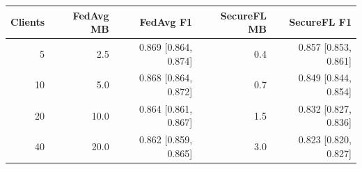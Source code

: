 \begin{tabular}{rrrrr}
\toprule
Clients & FedAvg MB & FedAvg F1 & SecureFL MB & SecureFL F1 \\
\midrule
5 & 2.5 & 0.869 [0.864, 0.874] & 0.4 & 0.857 [0.853, 0.861] \\
10 & 5.0 & 0.868 [0.864, 0.872] & 0.7 & 0.849 [0.844, 0.854] \\
20 & 10.0 & 0.864 [0.861, 0.867] & 1.5 & 0.832 [0.827, 0.836] \\
40 & 20.0 & 0.862 [0.859, 0.865] & 3.0 & 0.823 [0.820, 0.827] \\
\bottomrule
\end{tabular}
